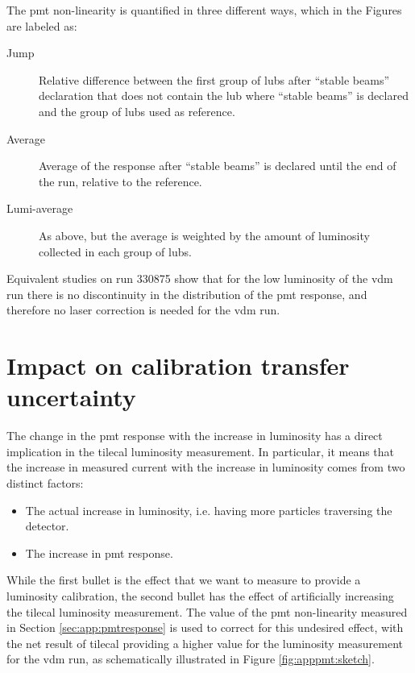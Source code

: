 The \gls{pmt} non-linearity is quantified in three different ways, which in the Figures are labeled as:
\begin{description}
\item[Jump] Relative difference between the first group of \glspl{lub} after ``stable beams'' declaration that does not contain the 
\gls{lub} where ``stable beams'' is declared and the group of \glspl{lub} used as reference.
\item[Average] Average of the response after ``stable beams'' is declared until the end of the run, relative to the reference.
\item[Lumi-average] As above, but the average is weighted by the amount of luminosity collected in each group of \glspl{lub}.
\end{description}

 Equivalent studies on run 330875 show that for the low luminosity of the \gls{vdm} run there is no discontinuity in the 
 distribution of the \gls{pmt} response, and therefore no laser correction is needed for the \gls{vdm} run. 

\FloatBarrier


\section{Impact on calibration transfer uncertainty}

The change in the \gls{pmt} response with the increase in luminosity has a direct implication in the 
\gls{tilecal} luminosity measurement. 
In particular, it means that the increase in measured current with the increase in luminosity comes from 
two distinct factors:
\begin{itemize}
\item The actual increase in luminosity, i.e. having more particles traversing the detector.
\item The increase in \gls{pmt} response.
\end{itemize}

While the first bullet is the effect that we want to measure to provide a luminosity calibration, 
the second bullet has the effect of artificially increasing the \gls{tilecal} 
luminosity measurement. The value of the \gls{pmt} non-linearity measured in Section \ref{sec:app:pmtresponse} 
is used to correct for this undesired effect, with the net result of \gls{tilecal} providing a higher value 
for the luminosity measurement for the \gls{vdm} run, as schematically illustrated in Figure \ref{fig:apppmt:sketch}.


